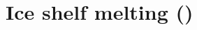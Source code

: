 \documentclass[../tex_main/NEMO_manual]{subfiles}
\begin{document}



%



\section{Ice shelf melting (\protect{})}
\label{sec:SBC_isf}
\end{document}
